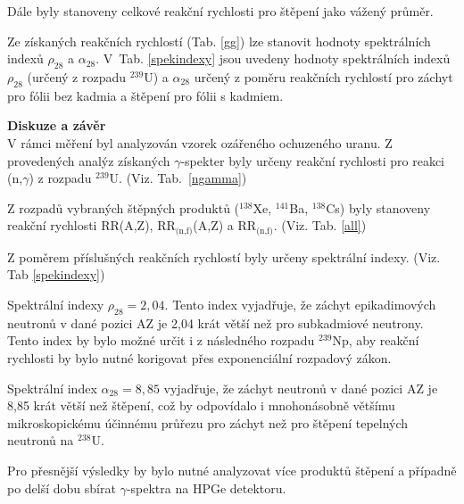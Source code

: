 Dále byly stanoveny celkové reakční rychlosti pro štěpení jako vážený průměr. 

Ze získaných reakčních rychlostí (Tab. \ref{gg}) lze stanovit hodnoty spektrálních indexů $\rho_\text{28}$ a $\alpha_\text{28}$. V~Tab. \ref{spekindexy} jsou uvedeny hodnoty spektrálních indexů $\rho_\text{28}$ (určený z rozpadu $^{239}$U) a $\alpha_\text{28}$ určený z poměru reakčních rychlostí pro záchyt pro fólii bez kadmia a štěpení pro fólii s kadmiem. 

\textbf{Diskuze a závěr}\\
V rámci měření byl analyzován vzorek ozářeného ochuzeného uranu. Z provedených analýz získaných $\gamma$-spekter byly určeny reakční rychlosti pro reakci (n,$\gamma$) z rozpadu $^{239}$U. (Viz. Tab.~\ref{ngamma})

Z rozpadů vybraných štěpných produktů ($^{138}$Xe, $^{141}$Ba, $^{138}$Cs) byly stanoveny reakční rychlosti  RR(A,Z), RR$_\text{(n,f)}$(A,Z) a RR$_\text{(n,f)}$. (Viz. Tab. \ref{all})

Z poměrem příslušných reakčních rychlostí byly určeny spektrální indexy. (Viz. Tab \ref{spekindexy})

Spektrální indexy \boldmath$\rho_\text{28} = 2,04$. Tento index vyjadřuje, že záchyt epikadimových neutronů v dané pozici AZ je 2,04 krát větší než pro subkadmiové neutrony. Tento index by bylo možné určit i z následného rozpadu $^\text{239}$Np, aby reakční rychlosti by bylo nutné korigovat přes exponenciální rozpadový zákon.

Spektrální index $\alpha_\text{28} = 8,85$ vyjadřuje, že záchyt neutronů v dané pozici AZ je 8,85 krát větší než štěpení, což by odpovídalo i mnohonásobně většímu mikroskopickému účinnému průřezu pro záchyt než pro štěpení tepelných neutronů na $^\text{238}$U.  

Pro přesnější výsledky by bylo nutné analyzovat více produktů štěpení a případně po delší dobu sbírat  $\gamma$-spektra na HPGe detektoru.

